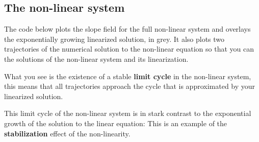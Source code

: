 \documentclass[10pt, letterpaper, answer]{exam}
\begin{document}
    \subsection{The non-linear system}\label{the-non-linear-system}

The code below plots the slope field for the full non-linear system and
overlays the exponentially growing linearized solution, in grey. It also
plots two trajectories of the numerical solution to the non-linear
equation so that you can the solutions of the non-linear system and its
linearization.

What you see is the existence of a stable \textbf{limit cycle} in the
non-linear system, this means that all trajectories approach the cycle
that is approximated by your linearized solution.

This limit cycle of the non-linear system is in stark contrast to the
exponential growth of the solution to the linear equation:
This is an example of the \textbf{stabilization} effect of the
non-linearity.
\end{document}
